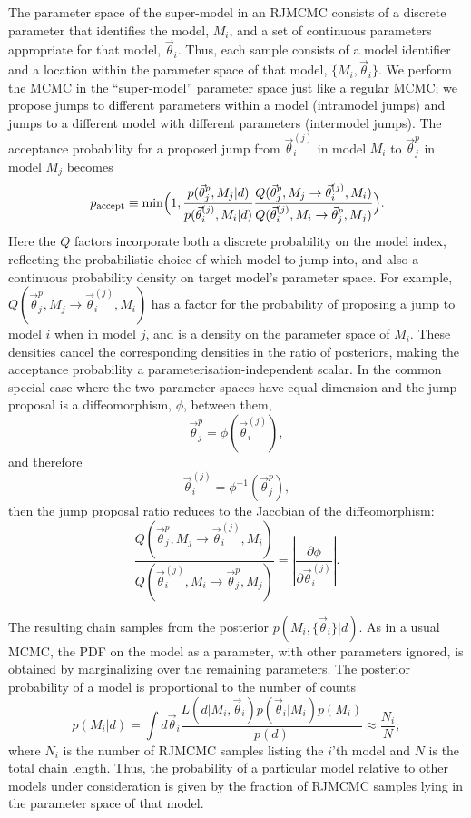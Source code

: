 \documentclass{rsos}
\newcommand{\vtheta}{\vec{\theta}}
\newcommand{\be}{\begin{equation}}
\newcommand{\ee}{\end{equation}}
\begin{document}
The parameter space of the super-model in an RJMCMC consists of a
discrete parameter that identifies the model, $M_i$, and a set of
continuous parameters appropriate for that model, $\vtheta_i$.  Thus,
each sample consists of a model identifier and a location within the
parameter space of that model, $\{M_i, \vtheta_i\}$.  We perform the
MCMC in the ``super-model'' parameter space just like a regular MCMC;
we propose jumps to different parameters within a model (intramodel
jumps) and jumps to a different model with different parameters
(intermodel jumps).  The acceptance probability for a proposed jump
from $\vtheta^{(j)}_i$ in model $M_i$ to $\vtheta^p_j$ in model $M_j$
becomes
\begin{equation}
p_{\textnormal{accept}} \equiv \min\Bigl(1,
\frac{p(\vtheta^p_j, M_j|d)}{p(\vtheta^{(j)}_i, M_i|d)}
\frac{Q(\vtheta^p_j ,M_j \to
  \vtheta^{(j)}_i, M_i)}{Q(\vtheta^{(j)}_i, M_i \to \vtheta^p_j, M_j)} \Bigr).
\end{equation}
Here the $Q$ factors incorporate both a discrete probability on the
model index, reflecting the probabilistic choice of which model to
jump into, and also a continuous probability density on target model's
parameter space.  For example,
$Q(\vtheta^p_j ,M_j \to \vtheta^{(j)}_i, M_i)$ has a factor for the
probability of proposing a jump to model $i$ when in model $j$, and is
a density on the parameter space of $M_i$.  These densities cancel the
corresponding densities in the ratio of posteriors, making the
acceptance probability a parameterisation-independent scalar.  In the
common special case where the two parameter spaces have equal
dimension and the jump proposal is a diffeomorphism, $\phi$, between
them,
\begin{equation}
  \vtheta^p_j = \phi\left( \vtheta^{(j)}_i \right),
\end{equation}
and therefore 
\begin{equation}
  \vtheta^{(j)}_i = \phi^{-1} \left( \vtheta^p_j \right),
\end{equation}
then the jump proposal ratio reduces to the Jacobian of the
diffeomorphism:
\begin{equation}
  \frac{Q(\vtheta^p_j ,M_j \to
  \vtheta^{(j)}_i, M_i)}{Q(\vtheta^{(j)}_i, M_i \to \vtheta^p_j, M_j)}
= \left| \frac{\partial \phi}{\partial \vtheta^{(j)}_i} \right|.
\end{equation}

 The resulting chain samples from the posterior
$p(M_i, \{\vtheta_i\}|d)$.  As in a usual MCMC, the PDF on the model as a
parameter, with other parameters ignored, is obtained by marginalizing
over the remaining parameters.  The posterior probability of a model
is proportional to the number of counts
%
\be
%
p(M_i|d) = \int d\vtheta_i \frac{L(d|M_i, \vtheta_i) p(\vtheta_i|M_i) p(M_i)}{p(d)}
\approx \frac{N_i}{N},
%
\ee
%
where $N_i$ is the number of RJMCMC samples listing the $i$'th model
and $N$ is the total chain length.  Thus, the probability of a
particular model relative to other models under consideration is given
by the fraction of RJMCMC samples lying in the parameter space of that
model.
 
\end{document}
